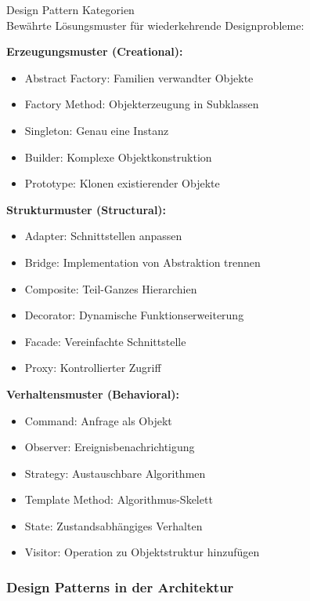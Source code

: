 \begin{concept}{Design Pattern Kategorien}\\
Bewährte Lösungsmuster für wiederkehrende Designprobleme:

\textbf{Erzeugungsmuster (Creational):}
\begin{itemize}
    \item Abstract Factory: Familien verwandter Objekte
    \item Factory Method: Objekterzeugung in Subklassen
    \item Singleton: Genau eine Instanz
    \item Builder: Komplexe Objektkonstruktion
    \item Prototype: Klonen existierender Objekte
\end{itemize}

\textbf{Strukturmuster (Structural):}
\begin{itemize}
    \item Adapter: Schnittstellen anpassen
    \item Bridge: Implementation von Abstraktion trennen
    \item Composite: Teil-Ganzes Hierarchien
    \item Decorator: Dynamische Funktionserweiterung
    \item Facade: Vereinfachte Schnittstelle
    \item Proxy: Kontrollierter Zugriff
\end{itemize}

\textbf{Verhaltensmuster (Behavioral):}
\begin{itemize}
    \item Command: Anfrage als Objekt
    \item Observer: Ereignisbenachrichtigung
    \item Strategy: Austauschbare Algorithmen
    \item Template Method: Algorithmus-Skelett
    \item State: Zustandsabhängiges Verhalten
    \item Visitor: Operation zu Objektstruktur hinzufügen
\end{itemize}
\end{concept}

\subsubsection{Design Patterns in der Architektur} %

